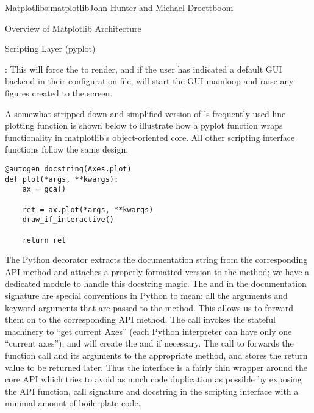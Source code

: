 \begin{aosachapter}{Matplotlib}{s:matplotlib}{John Hunter and Michael Droettboom}
\begin{aosasect1}{Overview of Matplotlib Architecture}
\begin{aosasect2}{Scripting Layer (pyplot)}
\begin{aosaitemize}
\item {}: This will force the  to render,
  and if the user has indicated a default GUI backend in their
  configuration file, will start the GUI mainloop and raise any
  figures created to the screen.

\end{aosaitemize}

A somewhat stripped down and simplified version of 's
frequently used line plotting function 
is shown below to illustrate how a pyplot function wraps functionality
in matplotlib's object-oriented core.  All other  scripting
interface functions follow the same design.

\begin{verbatim}
@autogen_docstring(Axes.plot)
def plot(*args, **kwargs):
    ax = gca()

    ret = ax.plot(*args, **kwargs)
    draw_if_interactive()

    return ret
\end{verbatim}

The Python decorator  extracts
the documentation string from the corresponding API method and
attaches a properly formatted version to the 
method; we have a dedicated module  to
handle this docstring magic.  The  and  in
the documentation signature are special conventions in Python to mean:
all the arguments and keyword arguments that are passed to the method.
This allows us to forward them on to the corresponding API method.
The call  invokes the stateful machinery to ``get
current Axes'' (each Python interpreter can have only one ``current
axes''), and will create the  and  if
necessary.  The call to  forwards
the function call and its arguments to the appropriate 
method, and stores the return value to be returned later.  Thus the
 interface is a fairly thin wrapper around the core
 API which tries to avoid as much code duplication as
possible by exposing the API function, call signature and docstring in
the scripting interface with a minimal amount of boilerplate code.

\end{aosasect2}

\end{aosasect1}


\end{aosachapter}
